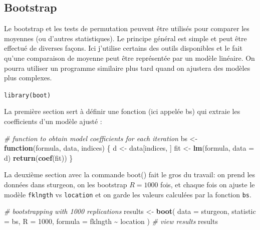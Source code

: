 \documentclass[
  12pt,
]{book}
\newenvironment{Shaded}{\begin{snugshade}}{\end{snugshade}}
\newcommand{\CommentTok}[1]{\textcolor[rgb]{0.56,0.35,0.01}{\textit{#1}}}
\newcommand{\ControlFlowTok}[1]{\textcolor[rgb]{0.13,0.29,0.53}{\textbf{#1}}}
\newcommand{\DataTypeTok}[1]{\textcolor[rgb]{0.13,0.29,0.53}{#1}}
\newcommand{\DecValTok}[1]{\textcolor[rgb]{0.00,0.00,0.81}{#1}}
\newcommand{\KeywordTok}[1]{\textcolor[rgb]{0.13,0.29,0.53}{\textbf{#1}}}
\newcommand{\NormalTok}[1]{#1}
\newcommand{\OperatorTok}[1]{\textcolor[rgb]{0.81,0.36,0.00}{\textbf{#1}}}
\newcommand{\StringTok}[1]{\textcolor[rgb]{0.31,0.60,0.02}{#1}}
\begin{document}
\hypertarget{bootstrap}{%
\subsection{Bootstrap}\label{bootstrap}}

Le bootstrap et les tests de permutation peuvent être utilisés pour comparer les moyennes (ou d'autres statistiques). Le principe général est simple et peut être effectué de diverses façons. Ici j'utilise certains des outils disponibles et le fait qu'une comparaison de moyenne peut être représentée par un modèle linéaire. On pourra utiliser un programme similaire plus tard quand on ajustera des modèles plus complexes.

\texttt{library(boot)}

La première section sert à définir une fonction (ici appelée bs) qui extraie les coefficients d'un modèle ajusté :

\begin{Shaded}
\begin{Highlighting}[]
\CommentTok{\# function to obtain model coefficients for each iteration}
\NormalTok{bs \textless{}{-}}\StringTok{ }\ControlFlowTok{function}\NormalTok{(formula, data, indices) \{}
\NormalTok{  d \textless{}{-}}\StringTok{ }\NormalTok{data[indices, ]}
\NormalTok{  fit \textless{}{-}}\StringTok{ }\KeywordTok{lm}\NormalTok{(formula, }\DataTypeTok{data =}\NormalTok{ d)}
  \KeywordTok{return}\NormalTok{(}\KeywordTok{coef}\NormalTok{(fit))}
\NormalTok{\}}
\end{Highlighting}
\end{Shaded}

La deuxième section avec la commande boot() fait le gros du travail: on prend les données dans sturgeon, on les bootstrap \(R = 1000\) fois, et chaque fois on ajuste le modèle \texttt{fklngth} vs \texttt{location} et on garde les valeurs calculées par la fonction \texttt{bs}.

\begin{Shaded}
\begin{Highlighting}[]
\CommentTok{\# bootstrapping with 1000 replications}
\NormalTok{results \textless{}{-}}\StringTok{ }\KeywordTok{boot}\NormalTok{(}
  \DataTypeTok{data =}\NormalTok{ sturgeon, }\DataTypeTok{statistic =}\NormalTok{ bs, }\DataTypeTok{R =} \DecValTok{1000}\NormalTok{,}
  \DataTypeTok{formula =}\NormalTok{ fklngth }\OperatorTok{\textasciitilde{}}\StringTok{ }\NormalTok{location}
\NormalTok{)}
\CommentTok{\# view results}
\NormalTok{results}
\end{Highlighting}
\end{Shaded}
\end{document}
